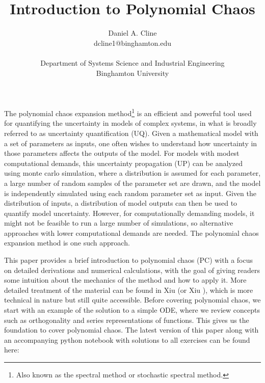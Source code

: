 \documentclass[11pt]{article}
\numberwithin{equation}{section}
\newcommand{\titlebox}[6]{
   \vspace*{-2cm}
   \noindent
   \begin{center}
   \framebox{
      \vbox{\vspace{1mm}
       \hbox to 5.83in { {\em #2 \hfill #3 } }
       \vspace{4mm}
       \hbox to 5.83in { \hfill {\bf \Large  #1 }\hfill }
       \vspace{4mm}
       \hbox to 5.83in { {\em #4 \hfill #5 } }
      \vspace{1mm}}
   }
   \end{center}
   \vspace*{2mm}
}
\begin{document}

\title{\vspace*{-1cm}Introduction to Polynomial Chaos}
\author{Daniel A. Cline\\ dcline1@binghamton.edu\\ \\ Department of Systems Science and Industrial Engineering\\ Binghamton University}
\maketitle

The polynomial chaos expansion method\footnote{Also known as the spectral method or stochastic spectral method.} is an efficient and powerful tool used for quantifying the uncertainty in models of complex systems, in what is broadly referred to as uncertainty quantification (UQ). Given a mathematical model with a set of parameters as inputs, one often wishes to understand how uncertainty in those parameters affects the outputs of the model. For models with modest computational demands, this uncertainty propagation (UP) can be analyzed using monte carlo simulation, where a distribution is assumed for each parameter, a large number of random samples of the parameter set are drawn, and the model is independently simulated using each random parameter set as input. Given the distribution of inputs, a distribution of model outputs can then be used to quantify model uncertainty. However, for computationally demanding models, it might not be feasible to run a large number of simulations, so alternative approaches with lower computational demands are needed. The polynomial chaos expansion method is one such approach.

\qquad This paper provides a brief introduction to polynomial chaos (PC) with a focus on detailed derivations and numerical calculations, with the goal of giving readers some intuition about the mechanics of the method and how to apply it. More detailed treatment of the material can be found in Xiu \cite{X10} (or Xiu \cite{X04}), which is more technical in nature but still quite accessible. Before covering polynomial chaos, we start with an example of the solution to a simple ODE, where we review concepts such as orthogonality and series representations of functions. This gives us the foundation to cover polynomial chaos. The latest version of this paper along with an accompanying python notebook with solutions to all exercises can be found here:
\end{document}
